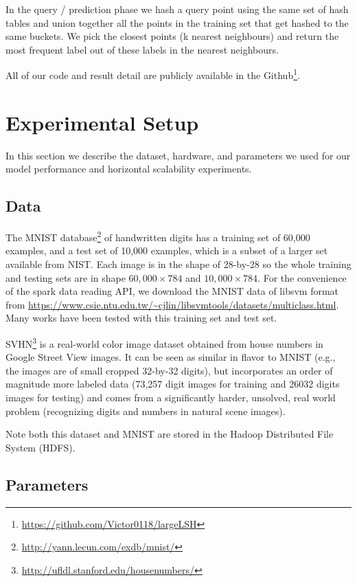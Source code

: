 \documentclass[letterpaper,twocolumn,10pt]{article}
\theoremstyle{definition}
\begin{document}
In the query / prediction phase we hash a query point using the same set of hash tables and union 
together all the points in the training set that get hashed to the same buckets. We pick the closest 
points (k nearest neighbours) and return the most frequent label out of these labels in the nearest 
neighbours.

All of our code and result detail are publicly available in the Github\footnote{\url{https://github.com/Victor0118/largeLSH}}.  

\section{Experimental Setup}

In this section we describe the dataset, hardware, and parameters we used for our model performance 
and horizontal scalability experiments.

\subsection{Data}
The MNIST database\footnote{\url{http://yann.lecun.com/exdb/mnist/}}\cite{lecun1998gradient} of handwritten digits has a training set of 60,000 examples, and a test set of 10,000 examples, which is a subset of a larger set available from NIST. Each image is in the shape of 28-by-28 so the whole training and testing sets are in shape $60,000 \times 784$ and $10,000 \times 784$. For the convenience of the spark data reading API, we download the MNIST data of libsvm format from \url{https://www.csie.ntu.edu.tw/~cjlin/libsvmtools/datasets/multiclass.html}.
Many works have been tested with this training set and test 
set\cite{lecun1998gradient,ciresan2011flexible,jarrett2009best}.

SVHN\footnote{\url{http://ufldl.stanford.edu/housenumbers/}}\cite{netzer2011reading} is a real-world color image dataset obtained from house numbers in Google
Street View images. It can be seen as similar in flavor to MNIST (e.g., the images are of small cropped 
32-by-32 digits), but incorporates an order of magnitude more labeled data (73,257 digit images for 
training and 26032 digits images for testing) and comes from a significantly harder, unsolved, real 
world problem (recognizing digits and numbers in natural scene images). 

Note both this dataset and MNIST are stored in the Hadoop Distributed File System (HDFS).

\subsection{Parameters}
\end{document}
